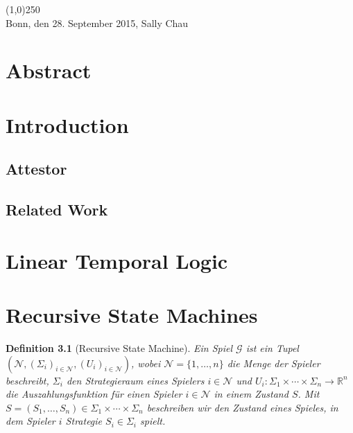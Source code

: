 \documentclass[a4paper, 12pt, twoside]{report}
\theoremstyle{plain}
\newtheorem{definition}[theorem]{Definition}
\begin{document}
	\noindent\line(1,0){250}\\
	Bonn, den 28. September 2015, Sally Chau
	
	\clearpage\mbox{}\clearpage
	
	\chapter*{Abstract}
	
	\clearpage\mbox{}\clearpage
	
	\doublespacing
	\tableofcontents
	\singlespacing
	\clearpage\mbox{}\clearpage
	\thispagestyle{empty} 
	
	\pagestyle{fancy}
	\fancyhead[RE]{\nouppercase\leftmark}
	\fancyhead[LO]{\nouppercase\rightmark}
	\fancyhead[LE,RO]{\thepage}
	\cfoot{}
	
	
	\chapter{Introduction}
	
	\section{Attestor}
	
	\section{Related Work}
	
	\chapter{Linear Temporal Logic}
	
	\chapter{Recursive State Machines}
	
	\begin{definition}[Recursive State Machine]\label{def:rsm}
		Ein \textup{Spiel} $\mathcal{G}$ ist ein Tupel $(\mathcal{N}, (\Sigma_i)_{i \in \mathcal{N}}, (U_i)_{i \in \mathcal{N}})$, wobei $\mathcal{N} = \{1, \dotsc, n\}$ die Menge der Spieler beschreibt, $\Sigma_i$ den \textup{Strategieraum} eines Spielers $i \in \mathcal{N}$ und  $U_i: \Sigma_1 \times \dotsb \times \Sigma_n \rightarrow \mathds{R}^n$ die \textup{Auszahlungsfunktion} für einen Spieler $i \in \mathcal{N}$ in einem Zustand $S$.
		Mit $S = (S_1, \dotsc, S_n) \in \Sigma_1 \times \dotsb \times \Sigma_n$ beschreiben wir den \textup{Zustand} eines Spieles, in dem Spieler $i$ Strategie $S_i \in \Sigma_i$ spielt. 
	\end{definition}
	
\end{document}
